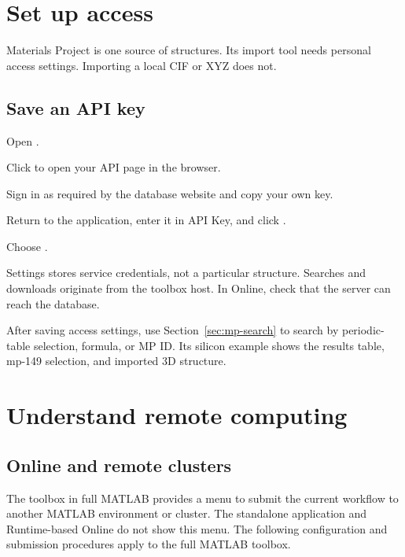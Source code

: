 \section{Set up  access}

Materials Project is one source of structures. Its import tool needs personal access settings. Importing a local CIF or XYZ does not.

\subsection{Save an API key}

\begin{steps}
\item Open .
\item Click  to open your API page in the browser.
\item Sign in as required by the database website and copy your own key.
\item Return to the application, enter it in API Key, and click .
\item Choose .
\end{steps}

Settings stores service credentials, not a particular structure. Searches and downloads originate from the toolbox host. In Online, check that the server can reach the database.

After saving access settings, use Section~\ref{sec:mp-search} to search by periodic-table selection, formula, or MP ID. Its silicon example shows the results table, mp-149 selection, and imported 3D structure.

\section{Understand remote computing}

\subsection{Online and remote clusters}

The toolbox in full MATLAB\regmark{} provides a  menu to submit the current workflow to another MATLAB\regmark{} environment or cluster. The standalone application and Runtime-based Online do not show this menu. The following configuration and submission procedures apply to the full MATLAB\regmark{} toolbox.

